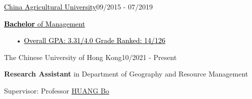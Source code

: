 \documentclass{joel_cv}
\begin{document}
\begin{sectionContentSimple}{\href{http://www.cau.edu.cn/}{\textcolor{black}{China Agricultural University}}}{09/2015 - 07/2019}
	\item \href{https://zhu-sk.github.io/Certificates_EN_2Pages.pdf}{\textcolor{black}{\textbf{Bachelor} of Management}}
	\begin{itemize}
	\item[•] \href{https://zhu-sk.github.io/Transcript_EN_2Pages.pdf}{\textcolor{black}{Overall GPA: 3.31/4.0 \quad Grade Ranked: 14/126}}%
	\end{itemize}
\end{sectionContentSimple}
\begin{sectionContentSimple}{The Chinese University of Hong Kong}{10/2021 - Present}
	\item \textbf{Research Assistant} in Department of Geography and Resource Management
	\item Supervisor: Professor \href{https://www.grm.cuhk.edu.hk/en/profile/bhuang/}{HUANG Bo} \quad	[\href{}{\textcolor{orange}{Certificate}}]
\end{sectionContentSimple}
\end{document}

